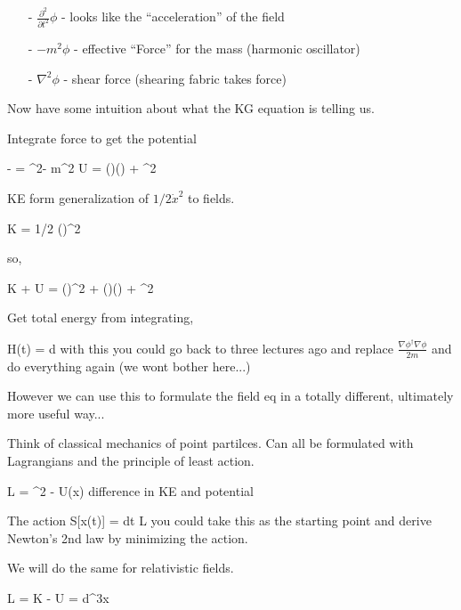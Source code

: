 {\begin{itemize}
\item[-] $\frac{\partial^2}{\partial t^2}\phi$ - looks like the ``acceleration'' of the field
\item[-] $- m^2 \phi$ - effective ``Force'' for the mass (harmonic oscillator)
\item[-] $\nabla^2\phi$ - shear force (shearing fabric takes force)
\end{itemize}

Now have some intuition about what the KG equation is telling us.

Integrate force to get the potential

\be
- = \nabla^2\phi - m^2 \phi \Rightarrow U = (\nabla \phi)(\nabla \phi) + \phi^2
\ee

KE form generalization of $1/2 \dot{x}^2$ to fields.

\be
K = 1/2 (\phi)^2
\ee

so,

\be
K + U  =  (\phi)^2 + (\nabla \phi)(\nabla \phi) + \phi^2
\ee

Get total energy from integrating, 

\be
H(t) = \int d 
\ee
with this you could go back to three lectures ago and replace $\frac{\nabla\phi^\dagger\nabla\phi}{2m}$ and do everything again (we wont bother here...)


However we can use this to formulate the field eq in a totally different, ultimately more useful way...


Think of classical mechanics of point partilces.
Can all be formulated with Lagrangians and the principle of least action. 


\be
L = ^2 - U(x)
\ee 
difference in KE and potential

The action
\be
S[x(t)] = \int dt L
\ee
you could take this as the starting point and derive Newton's 2nd law by minimizing the action.

We will do the same for relativistic fields.

\be
L = K - U = \int d^3x 
\ee



}
